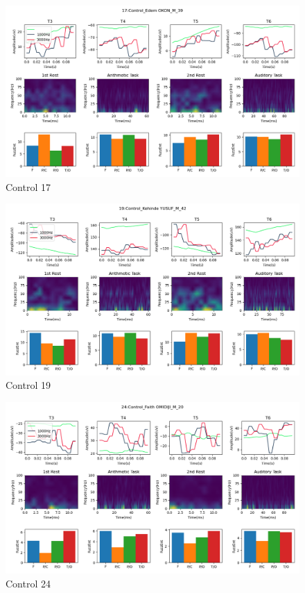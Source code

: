 \documentclass[conference]{IEEEconf}
\begin{document}
\clearpage
\begin{figure}
  \includegraphics[width=\textwidth]{../../data_analysis_results/results/Control/17.png}
  \caption{Control 17}
  \label{fig:control_17}
\end{figure}
\clearpage
\begin{figure}
  \includegraphics[width=\textwidth]{../../data_analysis_results/results/Control/19.png}
  \caption{Control 19}
  \label{fig:control_19}
\end{figure}
\clearpage
\begin{figure}
  \includegraphics[width=\textwidth]{../../data_analysis_results/results/Control/24.png}
  \caption{Control 24}
  \label{fig:control_24}
\end{figure}
\end{document}
